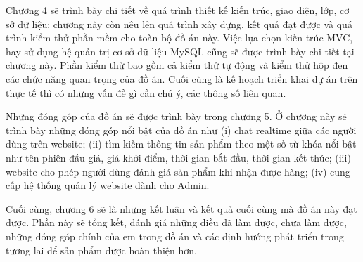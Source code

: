 \documentclass[../DoAn.tex]{subfiles}
\begin{document}
Chương 4 sẽ trình bày chi tiết về quá trình thiết kế kiến trúc, giao diện, lớp, cơ sở dữ liệu; chương này còn nêu lên quá trình xây dựng, kết quả đạt được và quá trình kiểm thử phần mềm cho toàn bộ đồ án này. Việc lựa chọn kiến trúc MVC, hay sử dụng hệ quản trị cơ sở dữ liệu MySQL cũng sẽ được trình bày chi tiết tại chương này. Phần kiểm thử bao gồm cả kiểm thử tự động và kiểm thử hộp đen các chức năng quan trọng của đồ án. Cuối cùng là kế hoạch triển khai dự án trên thực tế thì có những vấn đề gì cần chú ý, các thông số liên quan.

Những đóng góp của đồ án sẽ được trình bày trong chương 5. Ở chương này sẽ trình bày những đóng góp nổi bật của đồ án như (i) chat realtime giữa các người dùng trên website; (ii) tìm kiếm thông tin sản phẩm theo một số từ khóa nổi bật như tên phiên đấu giá, giá khởi điểm, thời gian bắt đầu, thời gian kết thúc; (iii) website cho phép người dùng đánh giá sản phẩm khi nhận được hàng; (iv) cung cấp hệ thống quản lý website dành cho Admin.

Cuối cùng, chương 6 sẽ là những kết luận và kết quả cuối cùng mà đồ án này đạt được. Phần này sẽ tổng kết, đánh giá những điều đã làm được, chưa làm được, những đóng góp chính của em trong đồ án và các định hướng phát triển trong tương lai để sản phẩm được hoàn thiện hơn.
\end{document}
